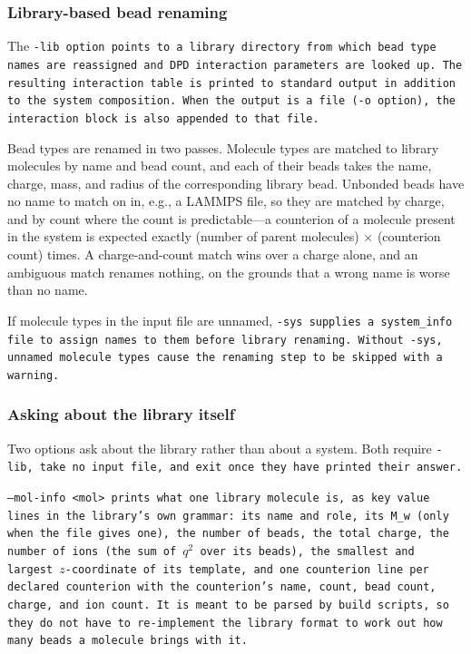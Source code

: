 \subsubsection*{Library-based bead renaming}

The \tt{-lib} option points to a library directory from which bead type names are
reassigned and DPD interaction parameters are looked up. The resulting interaction
table is printed to standard output in addition to the system composition. When
the output is a \field file (\tt{-o} option), the interaction block is also
appended to that file.

Bead types are renamed in two passes. Molecule types are matched to library
molecules by name and bead count, and each of their beads takes the name,
charge, mass, and radius of the corresponding library bead. Unbonded beads have
no name to match on in, e.g., a LAMMPS \data file, so they are matched by
charge, and by count where the count is predictable---a counterion of a
molecule present in the system is expected exactly (number of parent molecules)
$\times$ (counterion count) times. A charge-and-count match wins over a charge
alone, and an ambiguous match renames nothing, on the grounds that a wrong name
is worse than no name.

If molecule types in the input file are unnamed, \tt{-sys} supplies a
\tt{system_info} file to assign names to them before library renaming. Without
\tt{-sys}, unnamed molecule types cause the renaming step to be skipped with a
warning.

\subsubsection*{Asking about the library itself}

Two options ask about the library rather than about a system. Both require
\tt{-lib}, take no input file, and exit once they have printed their answer.

\tt{--mol-info <mol>} prints what one library molecule is, as \tt{key value}
lines in the library's own grammar: its \tt{name} and \tt{role}, its \tt{M_w}
(only when the file gives one), the number of beads, the total charge, the
number of ions (the sum of $q^2$ over its beads), the smallest and largest
$z$-coordinate of its template, and one \tt{counterion} line per declared
counterion with the counterion's name, count, bead count, charge, and ion
count. It is meant to be parsed by build scripts, so they do not have to
re-implement the library format to work out how many beads a molecule brings
with it.

